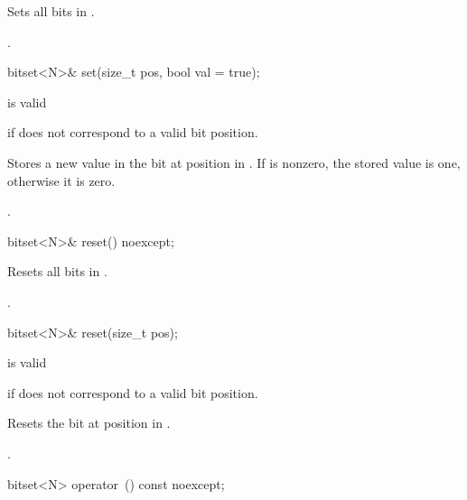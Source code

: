 \begin{itemdescr}
\pnum
\effects
Sets all bits in
.

\pnum
\returns
{}.
\end{itemdescr}

\begin{itemdecl}
bitset<N>& set(size_t pos, bool val = true);
\end{itemdecl}

\begin{itemdescr}
\pnum
\requires
{} is valid

\pnum
\throws
{}
if  does not correspond to a valid bit position.%

\pnum
\effects
Stores a new value in the bit at position  in
.
If  is nonzero, the stored value is one, otherwise it is zero.

\pnum
\returns
{}.
\end{itemdescr}

\begin{itemdecl}
bitset<N>& reset() noexcept;
\end{itemdecl}

\begin{itemdescr}
\pnum
\effects
Resets all bits in
.

\pnum
\returns
{}.
\end{itemdescr}

\begin{itemdecl}
bitset<N>& reset(size_t pos);
\end{itemdecl}

\begin{itemdescr}
\pnum
\requires
{} is valid

\pnum
\throws
{}
if  does not correspond to a valid bit position.
%

\pnum
\effects
Resets the bit at position  in
.

\pnum
\returns
{}.
\end{itemdescr}

%
\begin{itemdecl}
bitset<N> operator~() const noexcept;
\end{itemdecl}

